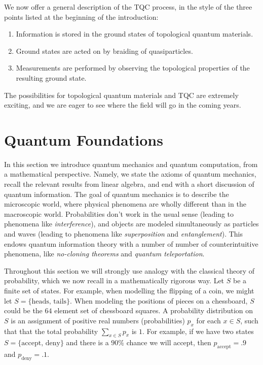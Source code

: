 \documentclass{article}
\theoremstyle{definition}
\numberwithin{figure}{section}
\begin{document}
We now offer a general description of the TQC process, in the style of the three points listed at the beginning of the introduction:

\begin{enumerate}
\item Information is stored in the ground states of topological quantum materials.
\item Ground states are acted on by braiding of quasiparticles.
\item Measurements are performed by observing the topological properties of the resulting ground state.
\end{enumerate}

The possibilities for topological quantum materials and TQC are extremely exciting, and we are eager to see where the field will go in the coming years.

\section{Quantum Foundations}
\label{Quantum foundations}

In this section we introduce quantum mechanics and quantum computation, from a mathematical perspective. Namely, we state the axioms of quantum mechanics, recall the relevant results from linear algebra, and end with a short discussion of quantum information. The goal of quantum mechanics is to describe the microscopic world, where physical phenomena are wholly different than in the macroscopic world. Probabilities don't work in the usual sense (leading to phenomena like \textit{interference}), and objects are modeled simultaneously as particles and waves (leading to phenomena like \textit{superposition} and \textit{entanglement}). This endows quantum information theory with a number of number of counterintuitive phenomena, like \textit{no-cloning theorems} and \textit{quantum teleportation}.

Throughout this section we will strongly use analogy with the classical theory of probability, which we now recall in a mathematically rigorous way. Let $S$ be a finite set of states. For example, when modelling the flipping of a coin, we might let $S=\{\text{heads},\,\text{tails}\}$. When modeling the positions of pieces on a chessboard, $S$ could be the $64$ element set of chessboard squares. A probability distribution on $S$ is an assignment of positive real numbers (probabilities) $p_x$ for each $x\in S$, such that that the total probability $\sum_{x\in S}p_x$ is $1$. For example, if we have two states $S=\{\text{accept},\,\text{deny}\}$ and there is a $90\%$ chance we will accept, then $p_{\text{accept}}=.9$ and $p_{\text{deny}}=.1$.
\end{document}
